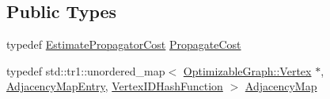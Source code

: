 \subsection*{Public Types}
\begin{DoxyCompactItemize}
\item 
typedef \mbox{\hyperlink{classg2o_1_1_estimate_propagator_cost}{Estimate\+Propagator\+Cost}} \mbox{\hyperlink{classg2o_1_1_estimate_propagator_a67a42f9c6d5f92562ac4ea12f81c8d9c}{Propagate\+Cost}}
\item 
typedef std\+::tr1\+::unordered\+\_\+map$<$ \mbox{\hyperlink{classg2o_1_1_optimizable_graph_1_1_vertex}{Optimizable\+Graph\+::\+Vertex}} $\ast$, \mbox{\hyperlink{classg2o_1_1_estimate_propagator_1_1_adjacency_map_entry}{Adjacency\+Map\+Entry}}, \mbox{\hyperlink{classg2o_1_1_estimate_propagator_1_1_vertex_i_d_hash_function}{Vertex\+I\+D\+Hash\+Function}} $>$ \mbox{\hyperlink{classg2o_1_1_estimate_propagator_aa450038ec206c089ecf023cb88cb2847}{Adjacency\+Map}}
\end{DoxyCompactItemize}
